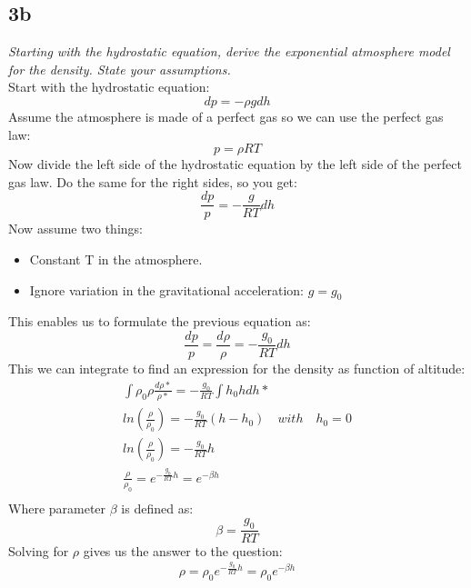 \subsection{3b}
\textit{Starting with the hydrostatic equation, derive the exponential atmosphere
model for the density. State your assumptions.}\\
Start with the hydrostatic equation:
\begin{equation}\label{eq:hydrostatic}
    dp = - \rho g dh
\end{equation}
Assume the atmosphere is made of a perfect gas so we can use the perfect gas law:
\begin{equation}\label{eq:perfectgas}
    p = \rho R T
\end{equation}
Now divide the left side of the hydrostatic equation by the left side of the perfect gas law. Do the same for the right sides, so you get:
\begin{equation}
    \frac{dp}{p} = -\frac{g}{RT} dh
\end{equation}
Now assume two things:
\begin{itemize}
    \item Constant T in the atmosphere.
    \item Ignore variation in the gravitational acceleration: $g = g_0$
\end{itemize}
This enables us to formulate the previous equation as:
\begin{equation}
    \frac{dp}{p} = \frac{d \rho}{\rho} = -\frac{g_0}{RT} dh
\end{equation}
This we can integrate to find an expression for the density as function of altitude:
\begin{equation}
\begin{split}
    \int{\rho_0}{\rho} \frac{d \rho*}{\rho*} = -\frac{g_0}{RT} \int{h_0}{h}dh* \\
    ln\left( \frac{\rho}{\rho_0} \right) = -\frac{g_0}{RT}(h-h_0) \quad with \quad h_0 = 0 \\
    ln\left( \frac{\rho}{\rho_0} \right) = -\frac{g_0}{RT}h \\
    \frac{\rho}{\rho_0} = e^{-\frac{g_0}{RT}h} = e^{-\beta h}\\
\end{split}
\end{equation}
Where parameter $\beta$ is defined as:
\begin{equation}
    \beta = \frac{g_0}{RT}
\end{equation}
Solving for $\rho$ gives us the answer to the question:
\begin{equation}
    \rho = \rho_0 e^{-\frac{g_0}{RT}h} = \rho_0 e^{-\beta h}
\end{equation}

